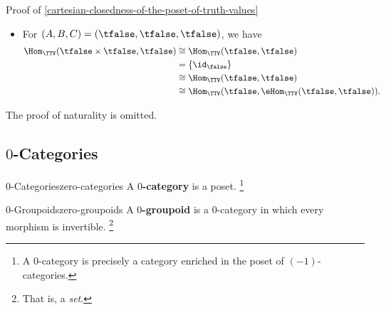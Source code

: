 \begin{Proof}{Proof of \cref{cartesian-closedness-of-the-poset-of-truth-values}}
\begin{itemize}
\begin{align*}
                                                          &\cong \Hom_{\TTV}(\tfalse,\eHom_{\TTV}(\tfalse,\ttrue)).
            \end{align*}
        \item For $(A,B,C)=(\tfalse,\tfalse,\tfalse)$, we have
            \begin{align*}
                \Hom_{\TTV}(\tfalse\times\tfalse,\tfalse) &\cong \Hom_{\TTV}(\tfalse,\tfalse)\\
                                                          &=     \{\id_{\false}\}\\
                                                          &\cong \Hom_{\TTV}(\tfalse,\tfalse)\\
                                                          &\cong \Hom_{\TTV}(\tfalse,\eHom_{\TTV}(\tfalse,\tfalse)).
            \end{align*}
    \end{itemize}
    The proof of naturality is omitted.
\end{Proof}
\subsection{$0$-Categories}\label{subsection-zero-categories}
\begin{definition}{$0$-Categories}{zero-categories}%
    A \textbf{$0$-category} is a poset.%
    \footnote{%
        A $0$-category is precisely a category enriched in the poset of $(-1)$-categories.
        \par\vspace*{-1.75\baselineskip}
    }%
\end{definition}
\begin{definition}{$0$-Groupoids}{zero-groupoids}%
    A \textbf{$0$-groupoid} is a $0$-category in which every morphism is invertible.%
    \footnote{%
        That is, a \emph{set}.
        \par\vspace*{-1.75\baselineskip}
    }%
\end{definition}
